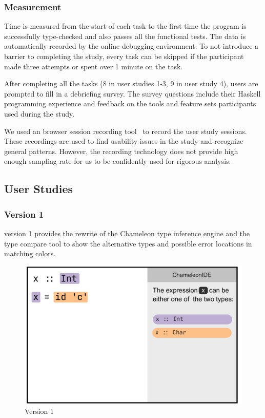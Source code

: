 \subsubsection*{\textbf{Measurement}}
Time is measured from the start of each task to the first time the program is successfully type-checked and also passes all the functional tests. The data is automatically recorded by the online debugging environment. To not introduce a barrier to completing the study, every task can be skipped if the participant made three attempts or spent over 1 minute on the task.


After completing all the tasks (8 in user studies 1-3, 9 in user study 4), users are prompted to fill in a debriefing survey. The survey questions include their Haskell programming experience and feedback on the tools and feature sets participants used during the study.


We used an browser session recording tool~\cite{openreplay} to record the user study sessions. These recordings are used to find usability issues in the study and recognize general patterns. However, the recording technology does not provide high enough sampling rate for us to be confidently used for rigorous analysis.

\subsection{\chameleon{} User Studies}


\subsubsection{\textbf{Version 1}}  
\chameleon{} version 1 provides the rewrite of the Chameleon type inference engine and the type compare tool to show the alternative types and possible error locations in matching colors.

\begin{figure}[h]
    \centering
    \includegraphics[width=\linewidth]{images/chameleon-v1.pdf}
    \caption{
        \chameleon{} Version 1
        }
    \label{fig:chameleon-v1}
\end{figure}

